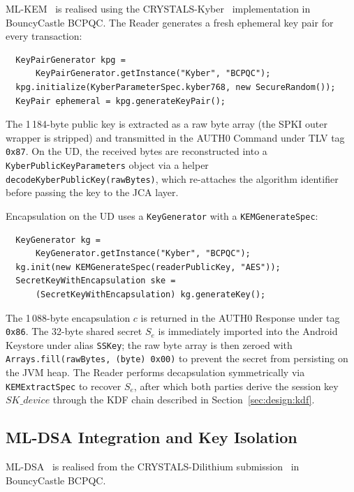 ML-KEM~\cite{NIST:FIPS203} is realised using the
CRYSTALS-Kyber~\cite{EuroSP:BDKLLSSSS18} implementation in BouncyCastle BCPQC.
The Reader generates a fresh ephemeral key pair for every transaction:

\begin{verbatim}
  KeyPairGenerator kpg =
      KeyPairGenerator.getInstance("Kyber", "BCPQC");
  kpg.initialize(KyberParameterSpec.kyber768, new SecureRandom());
  KeyPair ephemeral = kpg.generateKeyPair();
\end{verbatim}

\noindent
The 1\,184-byte public key is extracted as a raw byte array (the SPKI
outer wrapper is stripped) and transmitted in the AUTH0 Command under TLV
tag \texttt{0x87}.
On the UD, the received bytes are reconstructed into a
\texttt{KyberPublicKeyParameters} object via a helper
\texttt{decodeKyberPublicKey(rawBytes)}, which re-attaches the algorithm
identifier before passing the key to the JCA layer.

Encapsulation on the UD uses a \texttt{KeyGenerator} with a
\texttt{KEMGenerateSpec}:
\begin{verbatim}
  KeyGenerator kg =
      KeyGenerator.getInstance("Kyber", "BCPQC");
  kg.init(new KEMGenerateSpec(readerPublicKey, "AES"));
  SecretKeyWithEncapsulation ske =
      (SecretKeyWithEncapsulation) kg.generateKey();
\end{verbatim}

\noindent
The 1\,088-byte encapsulation $c$ is returned in the AUTH0 Response under
tag \texttt{0x86}.
The 32-byte shared secret $S_e$ is immediately imported into the Android
Keystore under alias \texttt{SSKey}; the raw byte array is then zeroed with
\texttt{Arrays.fill(rawBytes, (byte) 0x00)} to prevent the secret from
persisting on the JVM heap.
The Reader performs decapsulation symmetrically via \texttt{KEMExtractSpec}
to recover $S_e$, after which both parties derive the session key
$\mathit{SK\_device}$ through the KDF chain described in
Section~\ref{sec:design:kdf}.

\subsection{ML-DSA Integration and Key Isolation}
\label{sec:impl:isolation}

ML-DSA~\cite{NIST:FIPS204} is realised from the CRYSTALS-Dilithium
submission~\cite{TCHES:DKLLSSS18} in BouncyCastle BCPQC.


